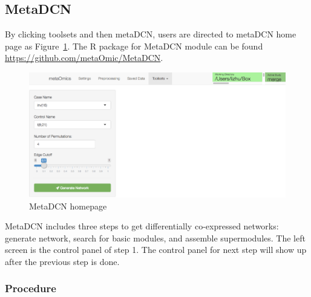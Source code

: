 \subsection{MetaDCN}
By clicking toolsets and then metaDCN,
users are directed to metaDCN home page as Figure~\ref{fig:metaDCNHome}.
The R package for MetaDCN module can be found \url{https://github.com/metaOmic/MetaDCN}.

\begin{figure}[H]
\begin{center}
\includegraphics[scale=0.8]{./figure/metaDCN/metaDCNHome}
\caption{MetaDCN homepage}
\label{fig:metaDCNHome}
\end{center}
\end{figure}

MetaDCN includes three steps to get differentially co-expressed networks: generate network, search for basic modules, and assemble supermodules. The left screen is the control panel of step 1. The control panel for next step will show up after the previous step is done.

\subsubsection{Procedure}

